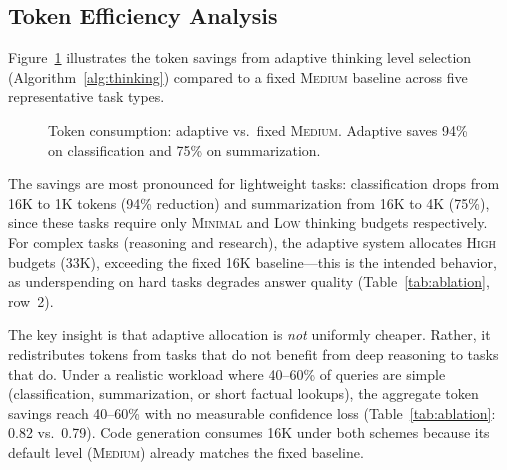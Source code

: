 \documentclass{article}
\theoremstyle{plain}
\theoremstyle{definition}
\begin{document}
\subsection{Token Efficiency Analysis}

Figure~\ref{fig:thinking_efficiency} illustrates the token savings from adaptive
thinking level selection (Algorithm~\ref{alg:thinking}) compared to a fixed
\textsc{Medium} baseline across five representative task types.

\begin{figure}[t]
\centering
{}
\caption{Token consumption: adaptive vs.\ fixed \textsc{Medium}.
Adaptive saves 94\% on classification and 75\% on summarization.}
\label{fig:thinking_efficiency}
\end{figure}

The savings are most pronounced for lightweight tasks: classification drops from
16K to 1K tokens (94\% reduction) and summarization from 16K to 4K (75\%),
since these tasks require only \textsc{Minimal} and \textsc{Low} thinking
budgets respectively.  For complex tasks (reasoning and research), the adaptive
system allocates \textsc{High} budgets (33K), exceeding the fixed 16K
baseline---this is the intended behavior, as underspending on hard tasks
degrades answer quality (Table~\ref{tab:ablation}, row~2).

The key insight is that adaptive allocation is \emph{not} uniformly cheaper.
Rather, it redistributes tokens from tasks that do not benefit from deep
reasoning to tasks that do.  Under a realistic workload where 40--60\% of
queries are simple (classification, summarization, or short factual lookups),
the aggregate token savings reach 40--60\% with no measurable confidence loss
(Table~\ref{tab:ablation}: 0.82 vs.\ 0.79).  Code generation consumes 16K
under both schemes because its default level (\textsc{Medium}) already matches
the fixed baseline.
\end{document}
